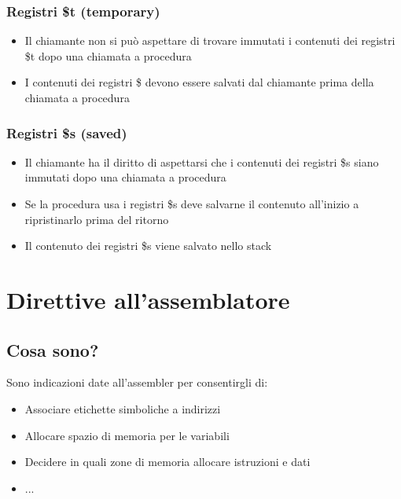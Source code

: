 \subsubsection{Registri \$t (temporary)}
\begin{itemize}
    \item Il chiamante non si può aspettare di trovare immutati i contenuti dei registri \$t dopo una chiamata a procedura
    \item I contenuti dei registri \$ devono essere salvati dal chiamante prima della chiamata a procedura
\end{itemize}

\subsubsection{Registri \$s (saved)}
\begin{itemize}
    \item Il chiamante ha il diritto di aspettarsi che i contenuti dei registri \$s siano immutati dopo una chiamata a procedura
    \item Se la procedura usa i registri \$s deve salvarne il contenuto all'inizio a ripristinarlo prima del ritorno
    \item Il contenuto dei registri \$s viene salvato nello stack
\end{itemize}

\newpage
\section{Direttive all'assemblatore}
\subsection{Cosa sono?}
Sono indicazioni date all'assembler per consentirgli di:
\begin{itemize}
    \item Associare etichette simboliche a indirizzi
    \item Allocare spazio di memoria per le variabili
    \item Decidere in quali zone di memoria allocare istruzioni e dati
    \item ...
\end{itemize}

